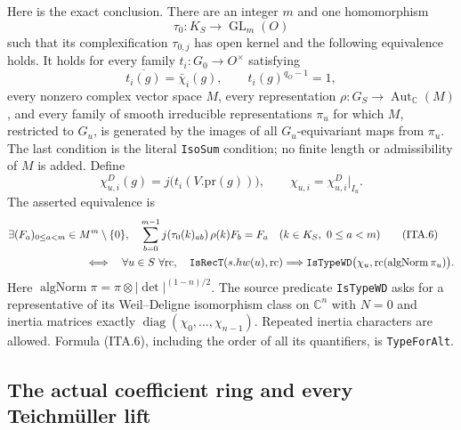 \documentclass[11pt,a4paper]{article}
\numberwithin{equation}{section}
\theoremstyle{remark}\newtheorem{remark}[theorem]{Remark}
\begin{document}
Here is the exact conclusion.  There are an integer $m$ and one
homomorphism
\[
                    \tau_0:K_S\longrightarrow\operatorname{GL}_m(O)
 \tag{ITA.3}
\]
such that its complexification $\tau_{0,j}$ has open kernel and
the following equivalence holds.  It holds for every family
$t_i:G_0\to O^\times$ satisfying
\[
 \overline{t_i(g)}=\bar\chi_i(g),\qquad
                       t_i(g)^{q_O-1}=1,                    \tag{ITA.4}
\]
every nonzero complex vector space $M$, every representation
$\rho:G_S\to\operatorname{Aut}_{\mathbb C}(M)$, and every
family of smooth irreducible representations $\pi_u$ for which
$M$, restricted to $G_u$, is generated by the images of all
$G_u$-equivariant maps from $\pi_u$.  The last condition is the
literal \texttt{Iso\allowbreak Sum} condition; no finite length or
admissibility of $M$ is added.  Define
\[
 \chi^D_{u,i}(g)=j\bigl(t_i(V.\mathrm{pr}(g))\bigr),\qquad
                              \chi_{u,i}=\chi^D_{u,i}|_{I_u}.
 \tag{ITA.5}
\]
The asserted equivalence is
\begin{align}
 &\exists (F_a)_{0\leq a<m}\in M^m\setminus\{0\},\quad
   \sum_{b=0}^{m-1}j(\tau_0(k)_{ab})\,\rho(k)F_b=F_a
                 \quad(k\in K_S,\ 0\leq a<m)
                                                        \tag{ITA.6}\\
 &\hspace{25mm}\Longleftrightarrow\quad
   \forall u\in S\ \forall\mathrm{rc},\quad
   \texttt{Is\allowbreak Rec\allowbreak T}(s.hw(u),\mathrm{rc})\Longrightarrow
   \texttt{Is\allowbreak Type\allowbreak WD}\bigl(\chi_u,
                       \mathrm{rc}(\operatorname{algNorm}\pi_u)\bigr).
                                                        \notag
\end{align}
Here
$\operatorname{algNorm}\pi=\pi\otimes|\det|^{(1-n)/2}$.
The source predicate \texttt{Is\allowbreak Type\allowbreak WD} asks for a representative
of its Weil--Deligne isomorphism class on $\mathbb C^n$ with
$N=0$ and inertia matrices exactly
$\operatorname{diag}(\chi_0,\ldots,\chi_{n-1})$.  Repeated
inertia characters are allowed.  Formula (ITA.6), including the
order of all its quantifiers, is \texttt{Type\allowbreak For\allowbreak Alt}.

\subsection{The actual coefficient ring and every Teichm\"uller lift}

\end{document}
